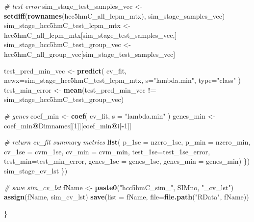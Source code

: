 \documentclass[
]{book}
\newenvironment{Shaded}{\begin{snugshade}}{\end{snugshade}}
\newcommand{\CommentTok}[1]{\textcolor[rgb]{0.56,0.35,0.01}{\textit{#1}}}
\newcommand{\DataTypeTok}[1]{\textcolor[rgb]{0.13,0.29,0.53}{#1}}
\newcommand{\DecValTok}[1]{\textcolor[rgb]{0.00,0.00,0.81}{#1}}
\newcommand{\KeywordTok}[1]{\textcolor[rgb]{0.13,0.29,0.53}{\textbf{#1}}}
\newcommand{\NormalTok}[1]{#1}
\newcommand{\OperatorTok}[1]{\textcolor[rgb]{0.81,0.36,0.00}{\textbf{#1}}}
\newcommand{\StringTok}[1]{\textcolor[rgb]{0.31,0.60,0.02}{#1}}
\begin{document}
\begin{Shaded}
\begin{Highlighting}[]
      \CommentTok{\# test error}
\NormalTok{      sim\_stage\_test\_samples\_vec <{-}}\StringTok{ }\KeywordTok{setdiff}\NormalTok{(}\KeywordTok{rownames}\NormalTok{(hcc5hmC\_all\_lcpm\_mtx), sim\_stage\_samples\_vec)}
\NormalTok{      sim\_stage\_hcc5hmC\_test\_lcpm\_mtx <{-}}\StringTok{ }\NormalTok{hcc5hmC\_all\_lcpm\_mtx[sim\_stage\_test\_samples\_vec,]}
\NormalTok{      sim\_stage\_hcc5hmC\_test\_group\_vec <{-}}\StringTok{ }\NormalTok{hcc5hmC\_all\_group\_vec[sim\_stage\_test\_samples\_vec]}

\NormalTok{      test\_pred\_min\_vec <{-}}\StringTok{ }\KeywordTok{predict}\NormalTok{(}
\NormalTok{       cv\_fit,}
       \DataTypeTok{newx=}\NormalTok{sim\_stage\_hcc5hmC\_test\_lcpm\_mtx,}
       \DataTypeTok{s=}\StringTok{"lambda.min"}\NormalTok{,}
       \DataTypeTok{type=}\StringTok{"class"}
\NormalTok{      )}
\NormalTok{      test\_min\_error <{-}}\StringTok{ }\KeywordTok{mean}\NormalTok{(test\_pred\_min\_vec }\OperatorTok{!=}\StringTok{ }\NormalTok{sim\_stage\_hcc5hmC\_test\_group\_vec)}

      \CommentTok{\# genes}
\NormalTok{      coef\_min <{-}}\StringTok{ }\KeywordTok{coef}\NormalTok{(}
\NormalTok{        cv\_fit,}
        \DataTypeTok{s =} \StringTok{"lambda.min"}
\NormalTok{      )}
\NormalTok{      genes\_min <{-}}\StringTok{ }\NormalTok{coef\_min}\OperatorTok{@}\NormalTok{Dimnames[[}\DecValTok{1}\NormalTok{]][coef\_min}\OperatorTok{@}\NormalTok{i[}\OperatorTok{{-}}\DecValTok{1}\NormalTok{]]}

      \CommentTok{\# return cv\_fit summary metrics}
      \KeywordTok{list}\NormalTok{(}
       \DataTypeTok{p\_1se =}\NormalTok{ nzero\_1se, }
       \DataTypeTok{p\_min =}\NormalTok{ nzero\_min, }
       \DataTypeTok{cv\_1se =}\NormalTok{ cvm\_1se, }
       \DataTypeTok{cv\_min =}\NormalTok{ cvm\_min, }
       \DataTypeTok{test\_1se=}\NormalTok{test\_1se\_error, }
       \DataTypeTok{test\_min=}\NormalTok{test\_min\_error, }
       \DataTypeTok{genes\_1se =}\NormalTok{ genes\_1se,}
       \DataTypeTok{genes\_min =}\NormalTok{ genes\_min)}
\NormalTok{    \})}
\NormalTok{    sim\_stage\_cv\_lst}
\NormalTok{  \})}

  \CommentTok{\# save  sim\_cv\_lst}
\NormalTok{  fName <{-}}\StringTok{ }\KeywordTok{paste0}\NormalTok{(}\StringTok{"hcc5hmC\_sim\_"}\NormalTok{, SIMno, }\StringTok{"\_cv\_lst"}\NormalTok{)}
  \KeywordTok{assign}\NormalTok{(fName, sim\_cv\_lst)}
  \KeywordTok{save}\NormalTok{(}\DataTypeTok{list =}\NormalTok{ fName, }\DataTypeTok{file=}\KeywordTok{file.path}\NormalTok{(}\StringTok{"RData"}\NormalTok{, fName))}

\NormalTok{\}}
\end{Highlighting}
\end{Shaded}
\end{document}

